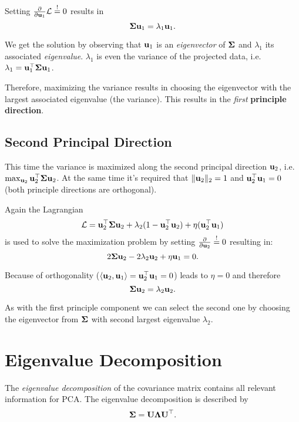 Setting \(\frac{\partial}{\partial\mathbf{u}_1} \mathcal{L} \overset{!}{=} 0\) results in
\[
\mathbf{\Sigma} \mathbf{u}_1 = \lambda_1 \mathbf{u}_1.
\]

We get the solution by observing that \(\mathbf{u}_1\) is an \textit{eigenvector} of \(\mathbf{\Sigma}\) and \(\lambda_1\) its associated \textit{eigenvalue}. \(\lambda_1\) is even the variance of the projected data, i.e. \(\lambda_1 = \mathbf{u}_1^\top \mathbf{\Sigma} \mathbf{u}_1\).

Therefore, maximizing the variance results in choosing the eigenvector with the largest associated eigenvalue (the variance). This results in the \textit{first} \textbf{principle direction}.

\subsection{Second Principal Direction}
This time the variance is maximized along the second principal direction \(\mathbf{u}_2\), i.e. \(\max_{\mathbf{u}_2} \mathbf{u}_2^\top \mathbf{\Sigma} \mathbf{u}_2\). At the same time it's required that \(\|\mathbf{u}_2\|_2 = 1\) and \(\mathbf{u}_2^\top \mathbf{u}_1 = 0\) (both principle directions are orthogonal).

Again the Lagrangian
\[
\mathcal{L} = \mathbf{u}_2^\top \mathbf{\Sigma} \mathbf{u}_2 + \lambda_2 (1 - \mathbf{u}_2^\top \mathbf{u}_2) + \eta (\mathbf{u}_2^\top \mathbf{u}_1)
\]
is used to solve the maximization problem by setting \(\frac{\partial}{\partial \mathbf{u}_2} \overset{!}{=} 0\) resulting in:
\[
2 \mathbf{\Sigma} \mathbf{u}_2 - 2 \lambda_2 \mathbf{u}_2 + \eta \mathbf{u}_1 = 0.
\]

Because of orthogonality (\(\langle \mathbf{u}_2, \mathbf{u}_1 \rangle = \mathbf{u}_2^\top \mathbf{u}_1 = 0\)) leads to \(\eta = 0\) and therefore
\[
\mathbf{\Sigma} \mathbf{u}_2 = \lambda_2 \mathbf{u}_2.
\]

As with the first principle component we can select the second one by choosing the eigenvector from \(\mathbf{\Sigma}\) with second largest eigenvalue \(\lambda_2\).

\section{Eigenvalue Decomposition}
\begin{definition}
The \textit{eigenvalue decomposition} of the covariance matrix contains all relevant information for PCA. The eigenvalue decomposition is described by \[
\mathbf{\Sigma} = \mathbf{U \Lambda U}^\top.
\]
\end{definition}

